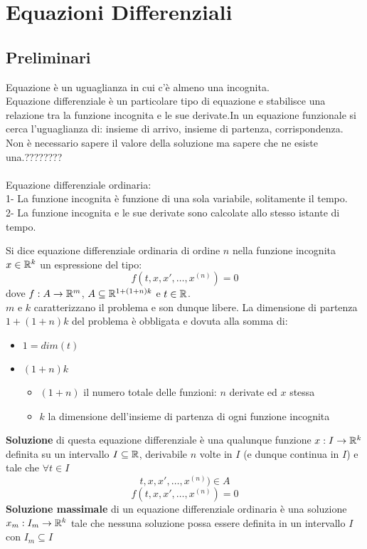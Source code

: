 \chapter{Equazioni Differenziali}
\section{Preliminari}
Equazione è un uguaglianza in cui c'è almeno una incognita.\\
Equazione differenziale è un particolare tipo di equazione e stabilisce una relazione tra la funzione incognita e le sue derivate.In un equazione funzionale si cerca l'uguaglianza di: insieme di arrivo, insieme di partenza, corrispondenza.\\
Non è necessario sapere il valore della soluzione ma sapere che ne esiste una.????????\\\\
Equazione differenziale ordinaria:\\
1- La funzione incognita è funzione di una sola variabile, solitamente il tempo.\\
2- La funzione incognita e le sue derivate sono calcolate allo stesso istante di tempo.\\
\begin{definition}
	\label{def:equaz_diff}
	Si dice equazione differenziale ordinaria di ordine $n$ nella funzione incognita $x\in \mathbb{R}^k$ un espressione del tipo:
	$$f(t,x, x',\ldots,x^{(n)})=0$$
	dove $f:A\to \mathbb{R}^m$, $A\subseteq \mathbb{R}^{1+(1+n)k}$ e $t\in \mathbb{R}$.\\
	$m$ e $k$ caratterizzano il problema e son dunque libere. La dimensione di partenza $1+(1+n)k$ del problema è obbligata e dovuta alla somma di:
	\begin{itemize}
		\item $1 = dim(t)$
		\item $(1+n)k$
		\begin{itemize}
			\item $(1+n)$ il numero totale delle funzioni: $n$ derivate ed $x$ stessa
			\item $k$ la dimensione dell'insieme di partenza di ogni funzione incognita
		\end{itemize}
	\end{itemize}
	\textbf{Soluzione} di questa equazione differenziale è una qualunque funzione $x:I\to \mathbb{R}^k$ definita su un intervallo $I\subseteq \mathbb{R}$, derivabile $n$ volte in $I$ (e dunque continua in $I$) e tale che $\forall t\in I$
	$$t,x, x',\ldots,x^{(n)}) \in A$$
	$$f(t,x, x',\ldots,x^{(n)})=0$$
	\textbf{Soluzione massimale} di un equazione differenziale ordinaria è una soluzione $x_m:I_m\to \mathbb{R}^k$ tale che nessuna soluzione possa essere definita in un intervallo $I$ con $I_m\subseteq I$
\end{definition}
